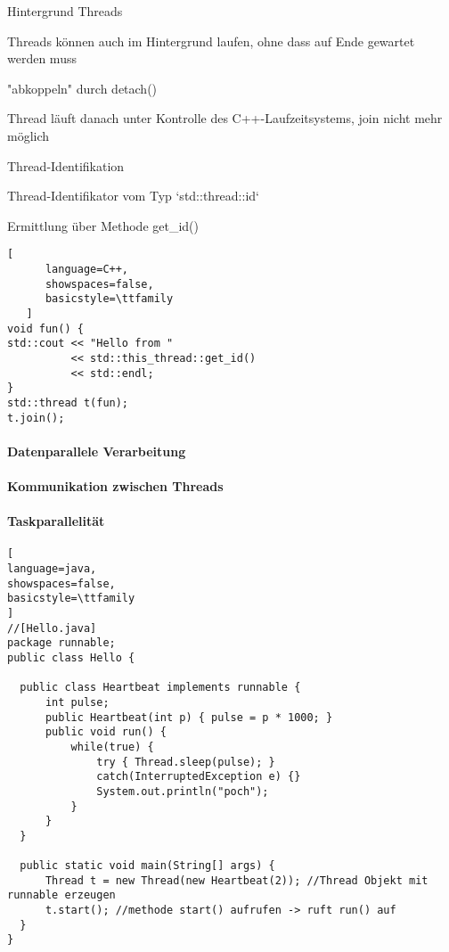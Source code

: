 \documentclass[10pt]{article}
\begin{document}
Hintergrund Threads
\begin{itemize*}
  \item Threads können auch im Hintergrund laufen, ohne dass auf Ende gewartet werden muss
  \item "abkoppeln" durch detach()
  \item Thread läuft danach unter Kontrolle des C++-Laufzeitsystems, join nicht mehr möglich
\end{itemize*}

Thread-Identifikation
\begin{itemize*}
  \item Thread-Identifikator vom Typ `std::thread::id`
  \item Ermittlung über Methode get\_id()
\end{itemize*}
\begin{lstlisting}[
      language=C++,
      showspaces=false,
      basicstyle=\ttfamily
   ]
void fun() {
std::cout << "Hello from "
          << std::this_thread::get_id()
          << std::endl;
}
std::thread t(fun);
t.join();
\end{lstlisting}



\paragraph{Datenparallele Verarbeitung}
\paragraph{Kommunikation zwischen Threads}
\paragraph{Taskparallelität}






\begin{lstlisting}[
language=java,
showspaces=false,
basicstyle=\ttfamily
]
//[Hello.java]
package runnable;
public class Hello {

  public class Heartbeat implements runnable {
      int pulse;
      public Heartbeat(int p) { pulse = p * 1000; }
      public void run() {
          while(true) {
              try { Thread.sleep(pulse); }
              catch(InterruptedException e) {}
              System.out.println("poch");
          }
      }
  }

  public static void main(String[] args) {
      Thread t = new Thread(new Heartbeat(2)); //Thread Objekt mit runnable erzeugen
      t.start(); //methode start() aufrufen -> ruft run() auf
  }
}
\end{lstlisting}
\hfill
\end{document}
